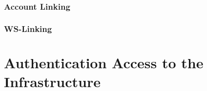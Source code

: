 \documentclass[12pt,a4paper]{univention}
\begin{document}
\subsubsection{Account Linking}
\subsubsection{WS-Linking}


\section{Authentication Access to the Infrastructure}
\end{document}
